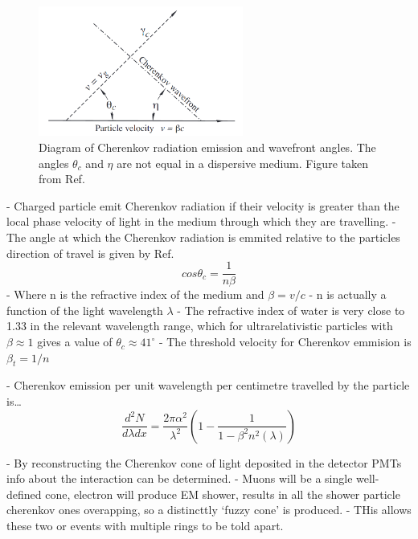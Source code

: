 \begin{figure} %
    \includegraphics[width=0.6\textwidth]{diagrams/4-chips/cherenkov.png}
    \caption[Diagram of Cherenkov radiation.]
    {Diagram of Cherenkov radiation emission and wavefront angles. The angles $\theta_{c}$ and
        $\eta$ are not equal in a dispersive medium. Figure taken from Ref.~\cite{particle2020}
    }
    \label{fig:cherenkov}
\end{figure}

- Charged particle emit Cherenkov radiation if their velocity is greater than the local phase
velocity of light in the medium through which they are travelling.
- The angle at which the Cherenkov radiation is emmited relative to the particles direction of
travel is given by Ref.~\cite{particle2020}
\begin{equation}
    cos\theta_{c} = \frac{1}{n\beta}
    \label{eq:cherenkov_angle}
\end{equation}
- Where n is the refractive index of the medium and $\beta=v/c$
- n is actually a function of the light wavelength $\lambda$
- The refractive index of water is very close to 1.33 in the relevant wavelength range, which for
ultrarelativistic particles with $\beta\approx 1$ gives a value of $\theta_{c}\approx 41^{\circ}$
- The threshold velocity for Cherenkov emmision is $\beta_{t}=1/n$

- Cherenkov emission per unit wavelength per centimetre travelled by the particle is\dots
\begin{equation}
    \frac{d^{2}N}{d\lambda dx}=\frac{2\pi\alpha^{2}}{\lambda^{2}}
    (1-\frac{1}{1-\beta^{2}n^{2}(\lambda)})
    \label{eq:cherenkov_emission}
\end{equation}

- By reconstructing the Cherenkov cone of light deposited in the detector PMTs info about the
interaction can be determined.
- Muons will be a single well-defined cone, electron will produce EM shower, results in all the
shower particle cherenkov ones overapping, so a distincttly `fuzzy cone' is produced.
- THis allows these two or events with multiple rings to be told apart.

